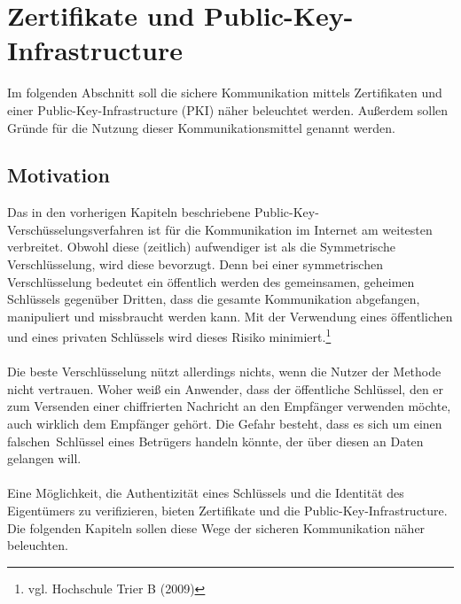 \author{Autor: Leonie Schiburr}
\chapter{Zertifikate und Public-Key-Infrastructure}
Im folgenden Abschnitt soll die sichere Kommunikation mittels Zertifikaten und einer Public-Key-Infrastructure (PKI) näher beleuchtet werden. Außerdem sollen Gründe für die Nutzung
dieser Kommunikationsmittel genannt werden.
\section{Motivation}
Das in den vorherigen Kapiteln beschriebene Public-Key-Verschüsselungsverfahren ist für die Kommunikation im Internet am weitesten verbreitet. Obwohl diese (zeitlich) aufwendiger ist als die Symmetrische Verschlüsselung, wird diese bevorzugt. Denn bei einer symmetrischen Verschlüsselung bedeutet ein öffentlich werden des gemeinsamen, geheimen Schlüssels gegenüber Dritten, dass die gesamte Kommunikation abgefangen, manipuliert und missbraucht werden kann. Mit der Verwendung eines öffentlichen und eines privaten Schlüssels wird dieses Risiko minimiert.\footnote{vgl. Hochschule Trier B (2009)}
\\
\\
Die beste Verschlüsselung nützt allerdings nichts, wenn die Nutzer der Methode nicht vertrauen. Woher weiß ein Anwender, dass der öffentliche Schlüssel,
den er zum Versenden einer chiffrierten Nachricht an den Empfänger verwenden möchte, auch wirklich dem Empfänger gehört. Die Gefahr besteht, dass
es sich um einen \glqq falschen\grqq~Schlüssel eines Betrügers handeln könnte, der über diesen an Daten gelangen will.
\\
\\
Eine Möglichkeit, die Authentizität eines Schlüssels und die Identität des Eigentümers zu verifizieren, bieten Zertifikate und die Public-Key-Infrastructure.
Die folgenden Kapiteln sollen diese Wege der sicheren Kommunikation näher beleuchten.
